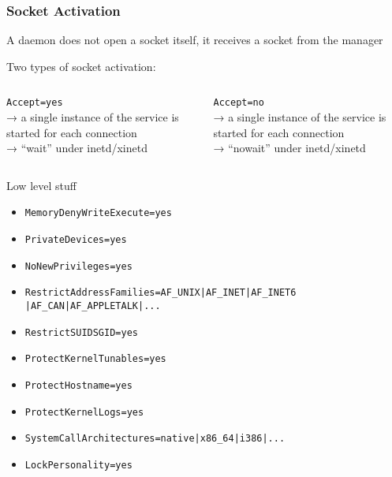 \documentclass[serif]{beamer}
\begin{document}
\begin{frame}[c]
  \frametitle{Socket Activation}

  A daemon does not open a socket itself, it receives a socket from the manager

  \medskip
  \pause

  \centering
  Two types of socket activation:

  \medskip

  \begin{columns}
    \begin{column}{0.5\textwidth}
      \texttt{Accept=yes}\\
      → a single instance of the service is started for each connection\\
      → ``wait'' under inetd/xinetd
    \end{column}
    \begin{column}{0.5\textwidth}
      \texttt{Accept=no}\\
      → a single instance of the service is started for each connection\\
      → ``nowait'' under inetd/xinetd
    \end{column}
  \end{columns}
\end{frame}

\begin{frame}[c]
  \Huge{Low level stuff}
\end{frame}

\begin{frame}
  \begin{itemize}
  \item \texttt{MemoryDenyWriteExecute=yes}
  \item \texttt{PrivateDevices=yes}
  \item \texttt{NoNewPrivileges=yes}
  \item \texttt{RestrictAddressFamilies=AF\_UNIX|AF\_INET|AF\_INET6
        \color{gray}|AF\_CAN|AF\_APPLETALK|...}
  \item \texttt{RestrictSUIDSGID=yes}
  \item \texttt{ProtectKernelTunables=yes}
  \item \texttt{ProtectHostname=yes}
  \item \texttt{ProtectKernelLogs=yes}
  \item \texttt{SystemCallArchitectures=native\color{gray}|x86\_64|i386|...}
  \item \texttt{LockPersonality=yes}
  \end{itemize}
\end{frame}
\end{document}
